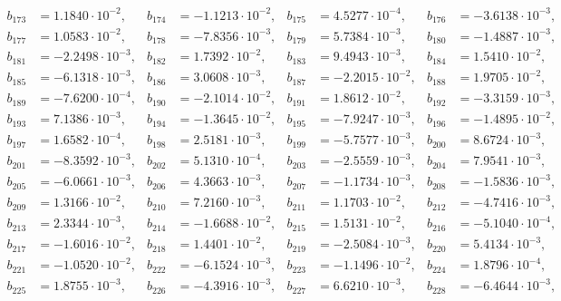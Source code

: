 \begin{align*}
b_{ 173 } &= 1.1840 \cdot 10^{ -2 }, & b_{ 174 } &= -1.1213 \cdot 10^{ -2 }, & b_{ 175 } &= 4.5277 \cdot 10^{ -4 }, & b_{ 176 } &= -3.6138 \cdot 10^{ -3 },\\ 
b_{ 177 } &= 1.0583 \cdot 10^{ -2 }, & b_{ 178 } &= -7.8356 \cdot 10^{ -3 }, & b_{ 179 } &= 5.7384 \cdot 10^{ -3 }, & b_{ 180 } &= -1.4887 \cdot 10^{ -3 },\\ 
b_{ 181 } &= -2.2498 \cdot 10^{ -3 }, & b_{ 182 } &= 1.7392 \cdot 10^{ -2 }, & b_{ 183 } &= 9.4943 \cdot 10^{ -3 }, & b_{ 184 } &= 1.5410 \cdot 10^{ -2 },\\ 
b_{ 185 } &= -6.1318 \cdot 10^{ -3 }, & b_{ 186 } &= 3.0608 \cdot 10^{ -3 }, & b_{ 187 } &= -2.2015 \cdot 10^{ -2 }, & b_{ 188 } &= 1.9705 \cdot 10^{ -2 },\\ 
b_{ 189 } &= -7.6200 \cdot 10^{ -4 }, & b_{ 190 } &= -2.1014 \cdot 10^{ -2 }, & b_{ 191 } &= 1.8612 \cdot 10^{ -2 }, & b_{ 192 } &= -3.3159 \cdot 10^{ -3 },\\ 
b_{ 193 } &= 7.1386 \cdot 10^{ -3 }, & b_{ 194 } &= -1.3645 \cdot 10^{ -2 }, & b_{ 195 } &= -7.9247 \cdot 10^{ -3 }, & b_{ 196 } &= -1.4895 \cdot 10^{ -2 },\\ 
b_{ 197 } &= 1.6582 \cdot 10^{ -4 }, & b_{ 198 } &= 2.5181 \cdot 10^{ -3 }, & b_{ 199 } &= -5.7577 \cdot 10^{ -3 }, & b_{ 200 } &= 8.6724 \cdot 10^{ -3 },\\ 
b_{ 201 } &= -8.3592 \cdot 10^{ -3 }, & b_{ 202 } &= 5.1310 \cdot 10^{ -4 }, & b_{ 203 } &= -2.5559 \cdot 10^{ -3 }, & b_{ 204 } &= 7.9541 \cdot 10^{ -3 },\\ 
b_{ 205 } &= -6.0661 \cdot 10^{ -3 }, & b_{ 206 } &= 4.3663 \cdot 10^{ -3 }, & b_{ 207 } &= -1.1734 \cdot 10^{ -3 }, & b_{ 208 } &= -1.5836 \cdot 10^{ -3 },\\ 
b_{ 209 } &= 1.3166 \cdot 10^{ -2 }, & b_{ 210 } &= 7.2160 \cdot 10^{ -3 }, & b_{ 211 } &= 1.1703 \cdot 10^{ -2 }, & b_{ 212 } &= -4.7416 \cdot 10^{ -3 },\\ 
b_{ 213 } &= 2.3344 \cdot 10^{ -3 }, & b_{ 214 } &= -1.6688 \cdot 10^{ -2 }, & b_{ 215 } &= 1.5131 \cdot 10^{ -2 }, & b_{ 216 } &= -5.1040 \cdot 10^{ -4 },\\ 
b_{ 217 } &= -1.6016 \cdot 10^{ -2 }, & b_{ 218 } &= 1.4401 \cdot 10^{ -2 }, & b_{ 219 } &= -2.5084 \cdot 10^{ -3 }, & b_{ 220 } &= 5.4134 \cdot 10^{ -3 },\\ 
b_{ 221 } &= -1.0520 \cdot 10^{ -2 }, & b_{ 222 } &= -6.1524 \cdot 10^{ -3 }, & b_{ 223 } &= -1.1496 \cdot 10^{ -2 }, & b_{ 224 } &= 1.8796 \cdot 10^{ -4 },\\ 
b_{ 225 } &= 1.8755 \cdot 10^{ -3 }, & b_{ 226 } &= -4.3916 \cdot 10^{ -3 }, & b_{ 227 } &= 6.6210 \cdot 10^{ -3 }, & b_{ 228 } &= -6.4644 \cdot 10^{ -3 },\\ 

\end{align*}
